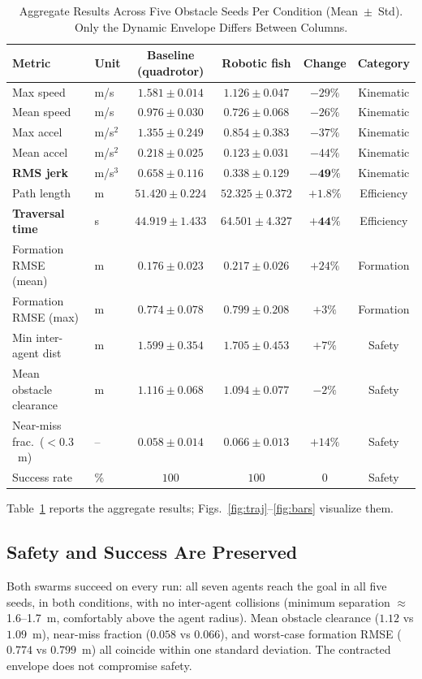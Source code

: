 \documentclass[journal]{IEEEtran}
\begin{document}
\begin{table}[t]
\caption{Aggregate Results Across Five Obstacle Seeds Per Condition
(Mean~$\pm$~Std). Only the Dynamic Envelope Differs Between Columns.}
\label{tab:results}
\centering
\begin{tabular}{llcccc}
\toprule
\textbf{Metric} & \textbf{Unit} & \textbf{Baseline (quadrotor)} &
\textbf{Robotic fish} & \textbf{Change} & \textbf{Category}\\
\midrule
Max speed              & m/s     & $1.581 \pm 0.014$ & $1.126 \pm 0.047$ & $-29\%$ & Kinematic\\
Mean speed             & m/s     & $0.976 \pm 0.030$ & $0.726 \pm 0.068$ & $-26\%$ & Kinematic\\
Max accel              & m/s$^2$ & $1.355 \pm 0.249$ & $0.854 \pm 0.383$ & $-37\%$ & Kinematic\\
Mean accel             & m/s$^2$ & $0.218 \pm 0.025$ & $0.123 \pm 0.031$ & $-44\%$ & Kinematic\\
\textbf{RMS jerk}      & m/s$^3$ & $0.658 \pm 0.116$ & $\mathbf{0.338 \pm 0.129}$ & $\mathbf{-49\%}$ & Kinematic\\
Path length            & m       & $51.420 \pm 0.224$ & $52.325 \pm 0.372$ & $+1.8\%$ & Efficiency\\
\textbf{Traversal time}& s       & $44.919 \pm 1.433$ & $\mathbf{64.501 \pm 4.327}$ & $\mathbf{+44\%}$ & Efficiency\\
Formation RMSE (mean)  & m       & $0.176 \pm 0.023$ & $0.217 \pm 0.026$ & $+24\%$ & Formation\\
Formation RMSE (max)   & m       & $0.774 \pm 0.078$ & $0.799 \pm 0.208$ & $+3\%$ & Formation\\
Min inter-agent dist   & m       & $1.599 \pm 0.354$ & $1.705 \pm 0.453$ & $+7\%$ & Safety\\
Mean obstacle clearance& m       & $1.116 \pm 0.068$ & $1.094 \pm 0.077$ & $-2\%$ & Safety\\
Near-miss frac.\ ($<0.3$~m) & --  & $0.058 \pm 0.014$ & $0.066 \pm 0.013$ & $+14\%$ & Safety\\
Success rate           & \%      & $100$ & $100$ & $0$ & Safety\\
\bottomrule
\end{tabular}
\end{table}

Table~\ref{tab:results} reports the aggregate results;
Figs.~\ref{fig:traj}--\ref{fig:bars} visualize them.

\subsection{Safety and Success Are Preserved}
Both swarms succeed on every run: all seven agents reach the goal in all five
seeds, in both conditions, with no inter-agent collisions (minimum separation
$\approx$1.6--1.7~m, comfortably above the agent radius). Mean obstacle
clearance ($1.12$ vs $1.09$~m), near-miss fraction ($0.058$ vs $0.066$), and
worst-case formation RMSE ($0.774$ vs $0.799$~m) all coincide within one
standard deviation. The contracted envelope does not compromise safety.
\end{document}
